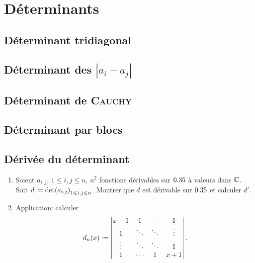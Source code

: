 \chapter{Déterminants}



\newpage

\section{Déterminant tridiagonal}


\section{Déterminant des \texorpdfstring{$|a_i - a_j|$}{|a_i - a_j|}}


\section{Déterminant de \textsc{Cauchy}}


\section{Déterminant par blocs}


\section{Dérivée du déterminant}
\begin{exercice}
    \begin{enumerate}
        \item Soient $a_{i,j}$, $1 \leqslant i, j \leqslant n$, $n^2$ fonctions dérivables sur $0.35$ à valeurs dans $\mathbb{C}$. Soit $d \defeq \det(a_{i,j})_{1 \leqslant i, j \leqslant n}$. Montrer que $d$ est dérivable sur $0.35$ et calculer $d'$.
        \item Application: calculer
        $$
        d_n(x) \defeq
        \begin{vmatrix}
            x+1 & 1 & \cdots & 1 \\
            1 & \ddots & \ddots & \vdots \\
            \vdots & \ddots & \ddots & 1 \\
            1 & \cdots & 1 & x+1
        \end{vmatrix}
        .$$
    \end{enumerate}
\end{exercice}

